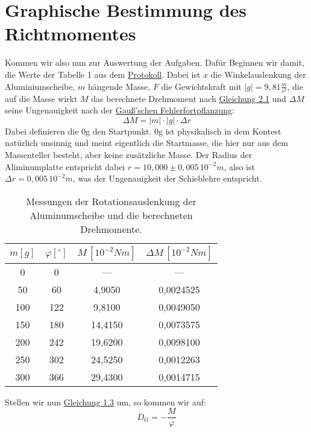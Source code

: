 \twocolumn

\section{Graphische Bestimmung des Richtmomentes}
Kommen wir also nun zur Auswertung der Aufgaben. Dafür Beginnen wir damit, die Werte der Tabelle 1  aus dem \hyperref[Protokoll]{Protokoll}.
Dabei ist $x$ die Winkelauslenkung der Aluminiumscheibe, $m$ hängende Masse, $F$ die Gewichtskraft mit $\left| g \right| =9,81 \frac{m}{s^2}$, die auf die Masse wirkt $M$ das berechnete Drehmoment nach \hyperref[eq:gleichgewichts_zustand]{Gleichung 2.1} und $\Delta M$ seine Ungenauigkeit nach der \hyperref[eq:gauss_fehlfortpflanzung]{Gauß'schen Fehlerfortpflanzung}:
\begin{equation}
    \Delta M = \left| m \right| \cdot \left| g \right| \cdot \Delta r
\end{equation}
Dabei definieren die 0g den Startpunkt. 0g ist physikalisch in dem Kontest natürlich unsinnig und meint eigentlich die Startmasse, die hier nur aus dem Massenteller besteht, aber keine zusätzliche Masse.
Der Radius der Aliminumplatte entspricht dabei $r = 10,000 \pm 0,005 \, 10^{-2}m$, also ist $\Delta r = 0,005 \, 10^{-2}m$, was der Ungenauigkeit der Schieblehre entspricht.
\begin{table}[h!]
    \begin{tabular}{c | c | c | c }
    $m [g]$ & $\varphi [^{\circ}]$ & $M \, [10^{-2}Nm]$ & $\Delta M \, [10^{-2}Nm]$ \\
    \hline
    0   & 0   & ---     &  ---    \\
    50  & 60  &  4,9050 & 0,0024525 \\
    100 & 122 &  9,8100 & 0,0049050 \\
    150 & 180 & 14,4150 & 0,0073575 \\
    200 & 242 & 19,6200 & 0,0098100 \\
    250 & 302 & 24,5250 & 0,0012263 \\
    300 & 366 & 29,4300 & 0,0014715 \\
    \hline
    \end{tabular}
    \caption{Messungen der Rotationsauslenkung der Aluminumscheibe und die berechneten Drehmomente.}
    \label{tab:verschiedene_massen_winkel_auslenkung}
\end{table}

Stellen wir nun \hyperref[eq:kraft_drehmoment_zusammenhang]{Gleichung 1.3} um, so kommen wir auf:
\begin{equation}
    D_G = - \frac{M}{\varphi}
\end{equation}

